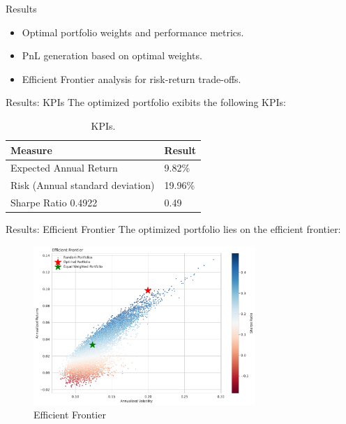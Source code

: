 \documentclass{beamer}
\begin{document}
\begin{frame}{Results}
  \begin{itemize}
    \item Optimal portfolio weights and performance metrics.
    \item PnL generation based on optimal weights.
    \item Efficient Frontier analysis for risk-return trade-offs.
  \end{itemize}
\end{frame}

\begin{frame}{Results: KPIs}
The optimized portfolio exibits the following KPIs:
\begin{table}[H]
\centering
\begin{tabular}{ | m{7cm} | m{4cm} | }
 \hline
 \textbf{Measure} & \textbf{Result} \\
 \hline
 Expected Annual Return & 9.82\% \\ 
 \hline
 Risk (Annual standard deviation) & 19.96\% \\
 \hline
 Sharpe Ratio 0.4922 & 0.49 \\ 
 \hline
\end{tabular}
 \label{table:tab1}
 \caption{KPIs.}
\end{table}
\end{frame}



\begin{frame}{Results: Efficient Frontier}
The optimized portfolio lies on the efficient frontier:
  \begin{figure}
    \centering
    \includegraphics[width=0.75\textwidth]{paper/figure/Optimal_PF.pdf}
    \caption{Efficient Frontier}
  \end{figure}
\end{frame}
\end{document}

